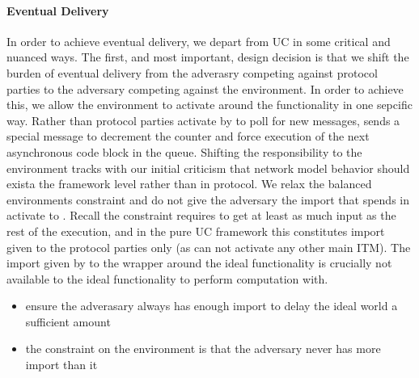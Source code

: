 \paragraph{Eventual Delivery}
In order to achieve eventual delivery, we depart from UC in some critical and nuanced ways.
The first, and most important, design decision is that we shift the burden of eventual delivery from the adverasry competing against protocol parties to the adversary competing against the environment. 
In order to achieve this, we allow the environment to activate \fwrapper around the functionality in one sepcific way. 
Rather than protocol parties activate by \Z to poll for new messages, \Z sends a special  message to decrement the counter and force execution of the next asynchronous code block in the queue.
Shifting the responsibility to the environment tracks with our initial criticism that network model behavior should exista the framework level rather than in protocol.
We relax the balanced environments constraint and do not give the adversary the import that \Z spends in activate \fwrapper to .
Recall the constraint requires \A to get at least as much input as the rest of the execution, and in the pure UC framework this constitutes import given to the protocol parties only (as \Z can not activate any other main ITM).
The import given by \Z to the wrapper around the ideal functionality is crucially not available to the ideal functionality to perform computation with.

\begin{itemize}
\item ensure the adverasary always has enough import to delay the ideal world a sufficient amount
\item the constraint on the environment is that the adversary never has more import than it
\end{itemize}

